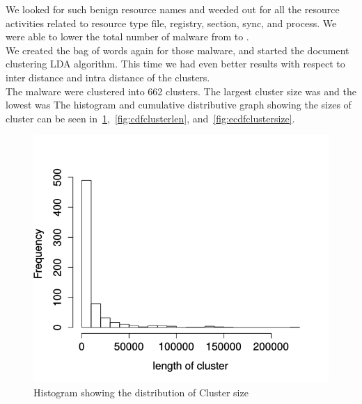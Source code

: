 We looked for such benign resource names and weeded out for all the resource activities related to resource type file, registry, section, sync, and process. We were able to lower the total number of malware from {\gettotalmalwareii{}} to {\gettotalmalwareiii{}}.\\
We created the bag of words again for those {\gettotalmalwareiii{}} malware, and started the document clustering LDA algorithm. This time we had even better results with respect to inter distance and intra distance of the clusters.\\
The malware were clustered into 662 clusters. The largest cluster size was {\getlargestclustersize{}} and the lowest was {\getlowestclustersize{}}
The histogram and cumulative distributive graph showing the sizes of cluster can be seen in~\ref{fig:histclustersize},~\ref{fig:cdfclusterlen}, and~\ref{fig:ecdfclustersize}.\\
\begin{figure}
\begin{center}
  \includegraphics[scale=0.3]{figures/histclustersize.png}
\end{center}
\caption{Histogram showing the distribution of Cluster size}
\label{fig:histclustersize}
\end{figure}
